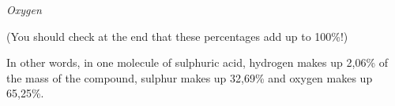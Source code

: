 {\begin{mdframed}[linewidth=4, leftmargin=40, rightmargin=40]
\begin{exercise}
\begin{enumerate}[noitemsep, label=\textbf{Step} \textbf{\arabic*}. ]
      
      \label{m38712*id280831}
        \textsl{Oxygen}
      \par 
      \label{m38712*id280837}\nopagebreak\noindent{}
    
      
      \label{m38712*id280876}(You should check at the end that these percentages add up to 100\%!)\par 
      \label{m38712*id280880}In other words, in one molecule of sulphuric acid, hydrogen makes up 2,06\% of the mass of the compound, sulphur makes up 32,69\% and oxygen makes up 65,25\%.\par 
\end{enumerate}
         

    \end{exercise}
    \end{mdframed}
    }
    \noindent
  
\label{m38712*secfhsst!!!underscore!!!id1029}\vspace{.5cm} 
      
